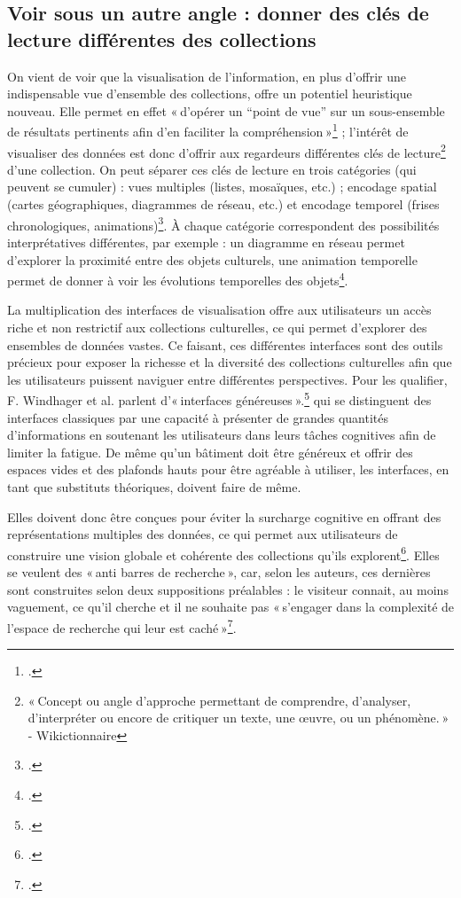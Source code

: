 \subsection{Voir sous un autre angle : donner des clés de lecture différentes des collections}

On vient de voir que la visualisation de l’information, en plus d’offrir une indispensable vue d’ensemble des collections, offre un potentiel heuristique nouveau. Elle permet en effet « d’opérer un “point de vue” sur un sous-ensemble de résultats pertinents afin d’en faciliter la compréhension »\footcite[§ 3]{hachour_fouille_2015} ; l’intérêt de visualiser des données est donc d’offrir aux regardeurs différentes clés de lecture\footnote{ « Concept ou angle d’approche permettant de comprendre, d’analyser, d’interpréter ou encore de critiquer un texte, une œuvre, ou un phénomène. » - Wikictionnaire } d’une collection. On peut séparer ces clés de lecture en trois catégories (qui peuvent se cumuler) : vues multiples (listes, mosaïques, etc.) ; encodage spatial (cartes géographiques, diagrammes de réseau, etc.) et encodage temporel (frises chronologiques, animations)\footcite[p. 76]{windhager_review_nodate}. À chaque catégorie correspondent des possibilités interprétatives différentes, par exemple : un diagramme en réseau permet d’explorer la proximité entre des objets culturels, une animation temporelle permet de donner à voir les évolutions temporelles des objets\footcite[p. 77]{windhager_review_nodate}.

La multiplication des interfaces de visualisation offre aux utilisateurs un accès riche et non restrictif aux collections culturelles, ce qui permet d’explorer des ensembles de données vastes. Ce faisant, ces différentes interfaces sont des outils précieux pour exposer la richesse et la diversité des collections culturelles afin que les utilisateurs puissent naviguer entre différentes perspectives. Pour les qualifier, F. Windhager et al. parlent d’« interfaces généreuses ».\footcite[p. 5]{windhager_orchestrating_2018} qui se distinguent des interfaces classiques par une capacité à présenter de grandes quantités d’informations en soutenant les utilisateurs dans leurs tâches cognitives afin de limiter la fatigue. De même qu’un bâtiment doit être généreux et offrir des espaces vides et des plafonds hauts pour être agréable à utiliser, les interfaces, en tant que substituts théoriques, doivent faire de même.

Elles doivent donc être conçues pour éviter la surcharge cognitive en offrant des représentations multiples des données, ce qui permet aux utilisateurs de construire une vision globale et cohérente des collections qu’ils explorent\footcite[pp. 5-6]{windhager_orchestrating_2018}. Elles se veulent des « anti barres de recherche », car, selon les auteurs, ces dernières sont construites selon deux suppositions préalables : le visiteur connait, au moins vaguement, ce qu’il cherche et il ne souhaite pas « s’engager dans la complexité de l’espace de recherche qui leur est caché »\footcite[p. 6]{windhager_orchestrating_2018}.

